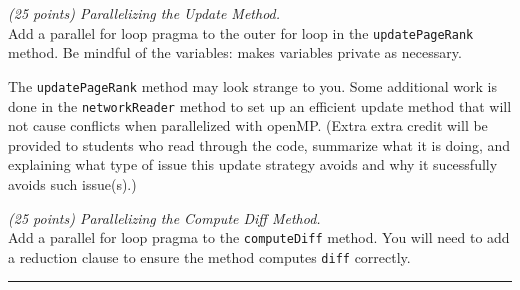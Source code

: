 \documentclass{article}
\newcommand{\myhrule}{ \begin{center}\rule{.9\linewidth}{.25mm}\end{center} }
\newcommand{\pad}{\vspace{8pt}\noindent}
\begin{document}
\vspace{4pt}

\pad {\bf 2:} {\it (25 points) Parallelizing the Update Method.}
\vspace{8pt} \\
\noindent Add a parallel for loop pragma to the outer for loop in the \texttt{updatePageRank} method. Be mindful of the variables: makes variables private as necessary.


The \texttt{updatePageRank} method may look strange to you. Some additional work is done in the \texttt{networkReader} method to set up an efficient update method that will not cause conflicts when parallelized with openMP. (Extra extra credit will be provided to students who read through the code, summarize what it is doing, and explaining what type of issue this update strategy avoids and why it sucessfully avoids such issue(s).)

\vspace{4pt}

\pad {\bf 3:} {\it (25 points) Parallelizing the Compute Diff Method.}
\vspace{8pt} \\
\noindent Add a parallel for loop pragma to the \texttt{computeDiff} method.  You will need to add a reduction clause to ensure the method computes \texttt{diff} correctly.

\myhrule



\end{document}
